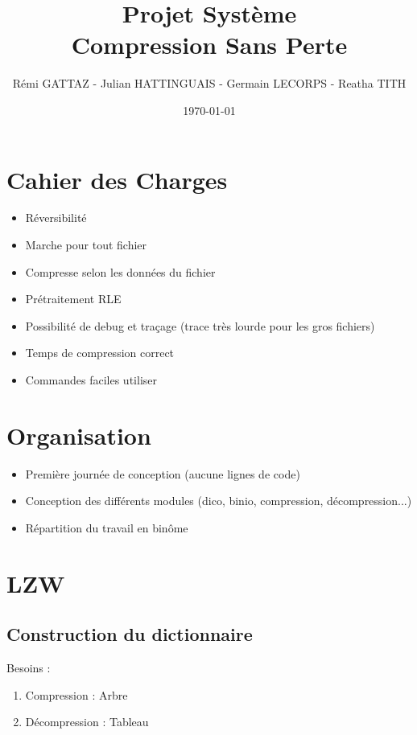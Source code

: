 \documentclass{beamer}
\title{
    Projet Système\\
    Compression Sans Perte
}
\author{Rémi GATTAZ - Julian HATTINGUAIS - Germain LECORPS - Reatha TITH}
\date{\today}
\begin{document}
\begin{frame}
\maketitle
\end{frame}

\begin{frame}
\tableofcontents
\end{frame}

\section{Cahier des Charges}

\begin{frame}
\begin{itemize}
\item Réversibilité
\item Marche pour tout fichier
\item Compresse selon les données du fichier
\item Prétraitement RLE
\item Possibilité de debug et traçage (trace très lourde pour les gros fichiers)
\item Temps de compression correct
\item Commandes faciles  utiliser
\end{itemize}
\end{frame}

\section{Organisation}

\begin{frame}
\begin{itemize}
\item Première journée de conception (aucune lignes de code)
\item Conception des différents modules (dico, binio, compression, décompression...)
\item Répartition du travail en binôme
\end{itemize}
\end{frame}


\section{LZW}

\subsection{Construction du dictionnaire}
\begin{frame}
 Besoins :
 \begin{enumerate}
  \item Compression : Arbre
  \item Décompression : Tableau
 \end{enumerate}
\end{frame}
\end{document}
